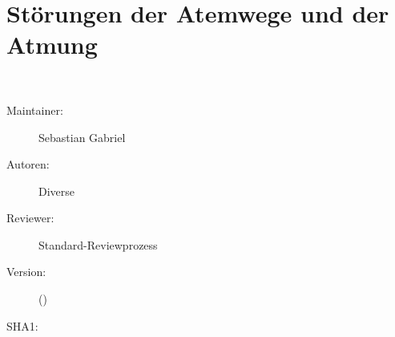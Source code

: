 \def\ChapterCode{RSP}
\chapter
[\CO{[ATM]} Störungen der Atemwege und der Atmung]
{Störungen der Atemwege und der Atmung}
\label{topic:respiratorische-notfaelle}
\label{chp:atm}
\ChapterIntro
{%
~~~
}
{%
\begin{description}
  \item[Maintainer:] Sebastian Gabriel
  \item[Autoren:] Diverse
  \item[Reviewer:] Standard-Reviewprozess
  \item[Version:] {\DocVersion} ({\DocVersionInfo})
  \item[SHA1:] {\DocGitCommit}
\end{description}

{\TxTeilkapitelAASS}
}

